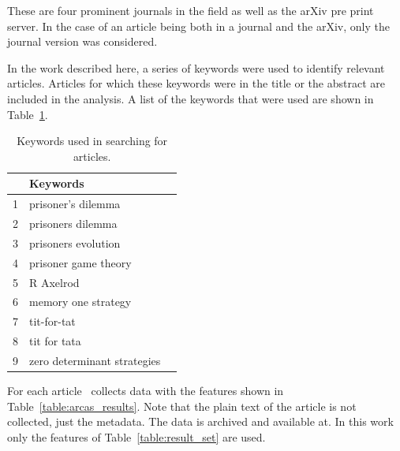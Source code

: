 \documentclass{article}
\begin{document}
These are four prominent journals in the field as well as the arXiv pre print
server.%
In the case of an article being both in a journal and the arXiv, only the 
journal version was considered. 

In the work described here, a series of keywords were used to identify relevant
articles. Articles for which these keywords were in the title or the abstract
are included in the analysis. A list of the keywords that were used are
shown in Table~\ref{table:search_keywords}.

\begin{table}[!hbtp]
    \begin{center}
        \begin{tabular}{lll}
            \toprule
             & Keywords & \\
            \midrule
             1 &  prisoner's dilemma & \\
             2 &  prisoners dilemma  & \\
             3 &  prisoners evolution & \\
             4 &  prisoner game theory & \\
             5 &  R Axelrod & \\
             6 &  memory one strategy & \\
             7 &  tit-for-tat & \\
             8 &  tit for tata & \\
             9 &  zero determinant strategies & \\
            \bottomrule
        \end{tabular}
    \end{center}
    \caption{Keywords used in searching for articles.}
    \label{table:search_keywords}
\end{table}

For each article~\cite{} collects data with the features shown in Table~\ref{table:arcas_results}.
Note that the plain text of the article is not collected, just the metadata. The
data is archived and available at. %
In this work only the features of Table~\ref{table:result_set} are used.
\end{document}
